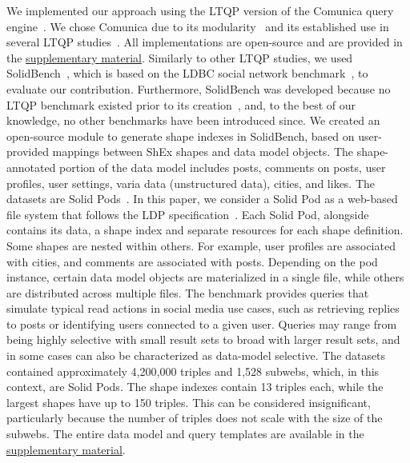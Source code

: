We implemented our approach using the LTQP version of the Comunica query engine~\cite{taelman_iswc_resources_comunica_2018}.
We chose Comunica due to its modularity~\cite{taelman_swj_componentsjs_2022} and its established use in several LTQP studies~\cite{Bogaerts2021LinkTW, Taelman2023, eschauzier_quweda_linkqueue_2023, Hanski2024, eschauzier_amw_rcubemetric_2024, tam2024opportunitiesshapebasedoptimizationlink}.
All implementations are open-source and are provided in the \hyperref[sec:supplementalMaterial]{supplementary material}.
Similarly to other LTQP studies, we used SolidBench~\cite{Taelman2023}, which is based on the LDBC social network benchmark~\cite{Angles2020}, to evaluate our contribution.
Furthermore, SolidBench was developed because no LTQP benchmark existed prior to its creation~\cite{hartig2018linked, Taelman2023}, and, to the best of our knowledge, no other benchmarks have been introduced since.
We created an open-source module to generate shape indexes in SolidBench, based on user-provided mappings between ShEx shapes and data model objects.
The shape-annotated portion of the data model includes posts, comments on posts, user profiles, user settings, varia data (unstructured data), cities, and likes.
The datasets are Solid Pods~\cite{sambra_solid_2016, dedecker2022s}.
In this paper, we consider a Solid Pod as a web-based file system that follows the LDP specification~\cite{w3LinkedData}.
Each Solid Pod, alongside contains its data, a shape index and separate resources for each shape definition.
Some shapes are nested within others. 
For example, user profiles are associated with cities, and comments are associated with posts.
Depending on the pod instance, certain data model objects are materialized in a single file, while others are distributed across multiple files.
The benchmark provides queries that simulate typical read actions in social media use cases, such as retrieving replies to posts or identifying users connected to a given user. 
Queries may range from being highly selective with small result sets to broad with larger result sets, and in some cases can also be characterized as data-model selective.
The datasets contained approximately 4,200,000 triples and 1,528 subwebs, which, in this context, are Solid Pods.
The shape indexes contain 13 triples each, while the largest shapes have up to 150 triples. 
This can be considered insignificant, particularly because the number of triples does not scale with the size of the subwebs.
The entire data model and query templates are available in the \hyperref[sec:supplementalMaterial]{supplementary material}.


